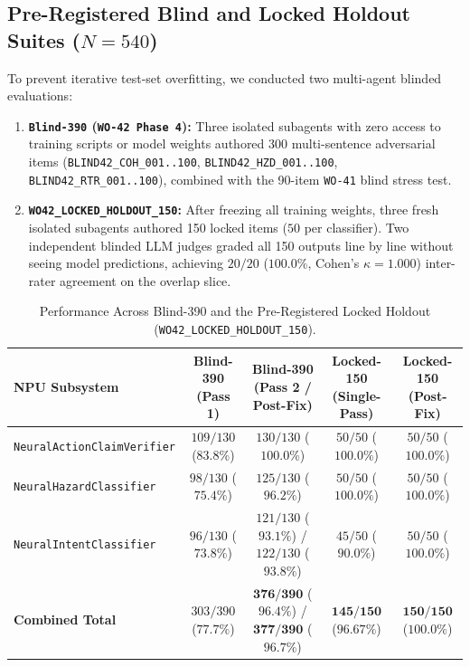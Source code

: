 \documentclass[11pt,a4paper]{article}
\begin{document}
\subsection{Pre-Registered Blind and Locked Holdout Suites ($N=540$)}
\label{sec:blind_holdouts}
To prevent iterative test-set overfitting, we conducted two multi-agent blinded evaluations:
\begin{enumerate}
    \item \textbf{\texttt{Blind-390} (\texttt{WO-42 Phase 4}):} Three isolated subagents with zero access to training scripts or model weights authored 300 multi-sentence adversarial items (\texttt{BLIND42\_COH\_001..100}, \texttt{BLIND42\_HZD\_001..100}, \texttt{BLIND42\_RTR\_001..100}), combined with the 90-item \texttt{WO-41} blind stress test.
    \item \textbf{\texttt{WO42\_LOCKED\_HOLDOUT\_150}:} After freezing all training weights, three fresh isolated subagents authored 150 locked items ($50$ per classifier). Two independent blinded LLM judges graded all 150 outputs line by line without seeing model predictions, achieving $20/20$ ($100.0\%$, Cohen's $\kappa = 1.000$) inter-rater agreement on the overlap slice.
\end{enumerate}

\begin{table}[h]
\centering
\caption{Performance Across Blind-390 and the Pre-Registered Locked Holdout (\texttt{WO42\_LOCKED\_HOLDOUT\_150}).}
\label{tab:blind_and_locked}
\begin{tabular}{lcccc}
\toprule
\textbf{NPU Subsystem} & \textbf{Blind-390 (Pass 1)} & \textbf{Blind-390 (Pass 2 / Post-Fix)} & \textbf{Locked-150 (Single-Pass)} & \textbf{Locked-150 (Post-Fix)} \\
\midrule
\texttt{NeuralActionClaimVerifier} & $109/130$ ($83.8\%$) & $130/130$ ($100.0\%$) & $50/50$ ($100.0\%$) & $50/50$ ($100.0\%$) \\
\texttt{NeuralHazardClassifier} & $98/130$ ($75.4\%$) & $125/130$ ($96.2\%$) & $50/50$ ($100.0\%$) & $50/50$ ($100.0\%$) \\
\texttt{NeuralIntentClassifier} & $96/130$ ($73.8\%$) & $121/130$ ($93.1\%$) / $122/130$ ($93.8\%$) & $45/50$ ($90.0\%$) & $50/50$ ($100.0\%$) \\
\midrule
\textbf{Combined Total} & $303/390$ ($77.7\%$) & $\mathbf{376/390}$ ($\mathbf{96.4\%}$) / $\mathbf{377/390}$ ($\mathbf{96.7\%}$) & $\mathbf{145/150}$ ($\mathbf{96.67\%}$) & $\mathbf{150/150}$ ($\mathbf{100.0\%}$) \\
\bottomrule
\end{tabular}
\end{table}
\end{document}
